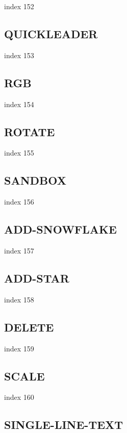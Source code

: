 \documentclass[a4paper]{report}
\begin{document}
index 152

\subsection{QUICKLEADER}

index 153

\subsection{RGB}

 index 154

\subsection{ROTATE}

index 155

\subsection{SANDBOX}

index 156

\subsection{ADD-SNOWFLAKE}

index 157

\subsection{ADD-STAR}

index 158

\subsection{DELETE}

index 159

\subsection{SCALE}

index 160

\subsection{SINGLE-LINE-TEXT}
\end{document}
